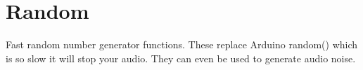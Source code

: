 \hypertarget{group__random}{}\section{Random}
\label{group__random}
Fast random number generator functions. These replace Arduino random() which is so slow it will stop your audio. They can even be used to generate audio noise. 